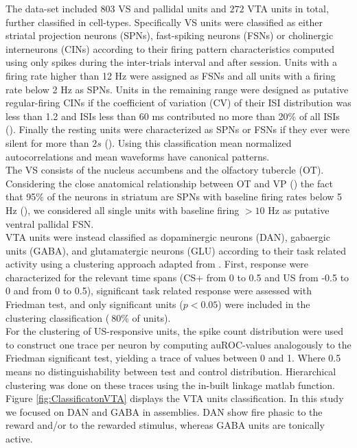 The data-set included $803$ VS and pallidal units and $272$ VTA units in total, further classified in cell-types. Specifically VS units were classified as either striatal projection neurons (SPNs), fast-spiking neurons (FSNs) or cholinergic interneurons (CINs) according to their firing pattern characteristics computed using only spikes during the inter-trials interval and after session. Units with a firing rate higher than 12 Hz were assigned as FSNs and all units with a firing rate below 2 Hz as SPNs. Units in the remaining range were designed as putative regular-firing CINs if the coefficient of variation (CV) of their ISI distribution was less than 1.2 and ISIs less than 60 ms contributed no more than 20$\%$ of all ISIs (\cite{Inokawa}). Finally the resting units were characterized as SPNs or FSNs if they ever were silent for more than $2s$ (\cite{Graybiel}). Using this classification mean normalized autocorrelations and mean waveforms have canonical patterns.\\The VS consists of the nucleus accumbens and the olfactory tubercle (OT). Considering the close anatomical relationship between OT and VP (\cite{Heimer1982}) the fact that 95$\%$ of the neurons in striatum are SPNs with baseline firing rates below 5 Hz (\cite{Kravitz}), we considered all single units with baseline firing $> 10$ Hz as putative ventral pallidal FSN.\\VTA units were instead classified as dopaminergic neurons (DAN), gabaergic units (GABA), and glutamatergic neurons (GLU) according to their task related activity using a clustering approach adapted from \cite{Uchida}. First, response were characterized for the relevant time spans (CS+ from 0 to 0.5 and US from -0.5 to 0 and from 0 to 0.5), significant task related response were assessed with Friedman test, and only significant units ($p<0.05$) were included in the clustering classification ($~80\%$ of units).\\For the clustering of US-responsive units, the spike count distribution were used to construct one trace per neuron by computing auROC-values analogously to the Friedman significant test, yielding a trace of values between 0 and 1. Where 0.5 means no distinguishability between test and control distribution. Hierarchical clustering was done on these traces using the in-built linkage matlab function.\\Figure \ref{fig:ClassificatonVTA} displays the VTA units classification. In this study we focused on DAN and GABA in assemblies. DAN show fire phasic to the reward and/or to the rewarded stimulus, whereas GABA units are tonically active.
